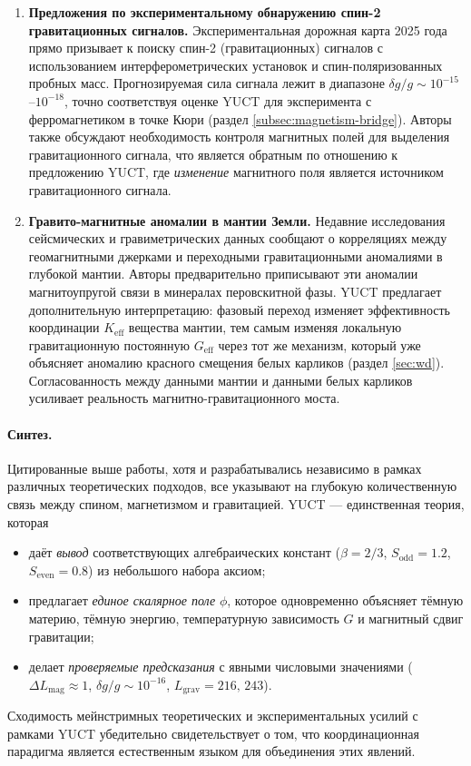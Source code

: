 \documentclass[12pt]{article}
\theoremstyle{remark}
\begin{document}
\begin{enumerate}
		\item \textbf{Предложения по экспериментальному обнаружению спин-2 гравитационных сигналов.}
		Экспериментальная дорожная карта 2025 года \cite{Spin2Proposal2025} прямо призывает к поиску спин-2 (гравитационных) сигналов с использованием интерферометрических установок и спин-поляризованных пробных масс. Прогнозируемая сила сигнала лежит в диапазоне $\delta g / g \sim 10^{-15}$–$10^{-18}$, точно соответствуя оценке YUCT для эксперимента с ферромагнетиком в точке Кюри (раздел \ref{subsec:magnetism-bridge}). Авторы также обсуждают необходимость контроля магнитных полей для выделения гравитационного сигнала, что является обратным по отношению к предложению YUCT, где \emph{изменение} магнитного поля является источником гравитационного сигнала.
		
		\item \textbf{Гравито-магнитные аномалии в мантии Земли.}
		Недавние исследования сейсмических и гравиметрических данных \cite{MantleGM2025} сообщают о корреляциях между геомагнитными джерками и переходными гравитационными аномалиями в глубокой мантии. Авторы предварительно приписывают эти аномалии магнитоупругой связи в минералах перовскитной фазы. YUCT предлагает дополнительную интерпретацию: фазовый переход изменяет эффективность координации $K_{\mathrm{eff}}$ вещества мантии, тем самым изменяя локальную гравитационную постоянную $G_{\mathrm{eff}}$ через тот же механизм, который уже объясняет аномалию красного смещения белых карликов (раздел \ref{sec:wd}). Согласованность между данными мантии и данными белых карликов усиливает реальность магнитно-гравитационного моста.
		
	\end{enumerate}
	
	\paragraph{Синтез.}
	Цитированные выше работы, хотя и разрабатывались независимо в рамках различных теоретических подходов, все указывают на глубокую количественную связь между спином, магнетизмом и гравитацией. YUCT — единственная теория, которая
	\begin{itemize}
		\item даёт \emph{вывод} соответствующих алгебраических констант ($\beta = 2/3$, $S_{\mathrm{odd}} = 1.2$, $S_{\mathrm{even}} = 0.8$) из небольшого набора аксиом;
		\item предлагает \emph{единое скалярное поле} $\phi$, которое одновременно объясняет тёмную материю, тёмную энергию, температурную зависимость $G$ и магнитный сдвиг гравитации;
		\item делает \emph{проверяемые предсказания} с явными числовыми значениями ($\Delta L_{\mathrm{mag}} \approx 1$, $\delta g/g \sim 10^{-16}$, $L_{\mathrm{grav}} = 216,\,243$).
	\end{itemize}
	Сходимость мейнстримных теоретических и экспериментальных усилий с рамками YUCT убедительно свидетельствует о том, что координационная парадигма является естественным языком для объединения этих явлений.
	
\end{document}
